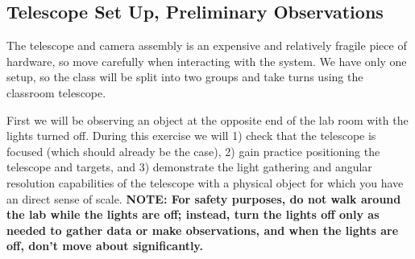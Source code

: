 
\subsection{Telescope Set Up, Preliminary Observations}\label{ai:sec:setup}

The telescope and camera assembly is an expensive and relatively fragile piece of hardware, so
move carefully when interacting with the system. We have only one setup, so the class will be split into two groups and take turns using the classroom telescope.

First we will be observing an object at the opposite end of the lab room with the lights turned off. During this exercise we will 1) check that the telescope is focused (which should already be the case), 2) gain practice positioning the telescope and targets, and 3) demonstrate the light gathering and angular resolution capabilities of the telescope with a physical object for which you have an direct sense of scale. \textbf{NOTE: For safety purposes, do not walk around the
	lab while the lights are off; instead, turn the lights off only as needed to gather data
	or make observations, and when the lights are off, don’t move about significantly.}

